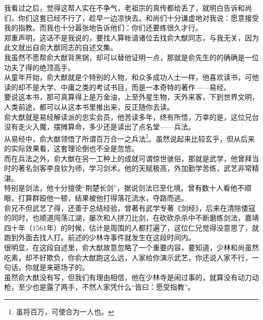 \begin{multicols}{\theparacolNo}
我看过之后，觉得这帮人实在不争气，老祖宗的真传都给丢了，就明白告诉和尚们，你们这套已经不行了，趁早一边凉快去。和尚们十分谦虚地对我说：愿意接受我的指教。而我也十分嚣张地告诉他们：你们还要练很久才行。\\

郑重声明，这话不是我说的，要找人算帐请诸位去找俞大猷同志，与我无关，因为此文就出自俞大猷同志的自述文集。\\

我虽然不愿帮俞大猷背黑锅，却可以替他证明一点，那就是俞先生的的确确是一位功夫了得的绝顶高手。\\

从童年开始，俞大猷就是个特别的人物，和众多成功人士一样，他喜欢读书，可他读的却不是大学、中庸之类的考试书目，而是一本奇特的著作——易经。\\

要说这本书，那可真算得上是万金油，上至外星生物，天外来客，下到世界文明，人类前途，都可以从这本书里推出来，反正随你去读。\\

俞大猷就是易经解读派的忠实会员，他苦读多年，终有所悟，万幸的是，这位兄台没有走火入魔，摆摊算命，多少还是读出了点名堂——兵法。\\

从易经中，俞大猷领悟了所谓百万合一之兵法\footnote{虽将百万，可使合为一人也。}。虽然说起来比较玄乎，但从后来的实际效果看，这套理论倒也不全是忽悠。\\

而在兵法之外，俞大猷在另一工种上的成就可谓惊世骇俗，那就是武学，他曾拜当时的著名剑客李良钦为师，学习剑术。他的天赋极高，外加勤学苦练，武艺非常精湛。\\

特别是剑法，他十分擅使“荆楚长剑”，据说剑法已至化境。曾有数十人看他不顺眼，打算群殴他一顿，结果被他打得落花流水，夺路而逃。\\

俞兄不但武艺了得，还善于总结经验，曾著有武学专著《剑经》，后来在清除倭寇的同时，也顺道闯荡江湖，屡次和人拼刀比剑，在砍砍杀杀中不断磨练剑法，嘉靖四十年（1561年）的时候，估计是周围的人都打遍了，这位仁兄觉得没意思了，就跑到外面去找人打。前述的少林寺事件就发生在这段时间内。\\

很明显，在这段自述里，俞大猷故意忽略了一个重要内容，要知道，少林和尚虽然吃素，却不好欺负，你俞大猷跑这么远，人家给你演示武艺，你还说人家不行，一句话，你就是来砸场子的。\\

虽然俞大猷没有写，但我们有理由相信，他在少林寺是闹过事的，就算没有动刀动枪，至少也是露了两手，不然人家凭什么“皆曰：愿受指教”。\\


\end{multicols}
